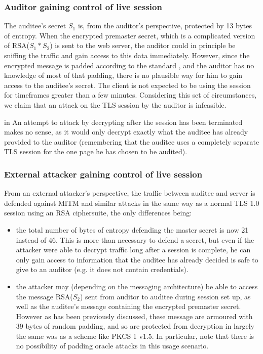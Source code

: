 \documentclass[10pt,a4paper]{article}
\begin{document}
\subsubsection{Auditor gaining control of live session}

\noindent The auditee's secret $S_1$ is, from the auditor's perspective, protected by 13 bytes of entropy. When the encrypted premaster secret, which is a complicated version of RSA($S_1*S_2$) is sent to the web server, the auditor could in principle be sniffing the traffic and gain access to this data immediately. However, since the encrypted message is padded according to the standard \cite{RSA_spec}, and the auditor has no knowledge of most of that padding, there is no plausible way for him to gain access to the auditee's secret. The client is not expected to be using the session for timeframes greater than a few minutes. Considering this set of circumstances, we claim that an attack on the TLS session by the auditor is infeasible.

 in
\noindent An attempt to attack by decrypting after the session has been terminated makes no sense, as it would only decrypt exactly what the auditee has already provided to the auditor (remembering that the auditee uses a completely separate TLS session for the one page he has chosen to be audited).

\subsubsection{External attacker gaining control of live session}

\noindent From an external attacker's perspective, the traffic between auditee and server is defended against MITM and similar attacks in the same way as a normal TLS 1.0 session using an RSA ciphersuite, the only differences being: 
\begin{itemize}
\item the total number of bytes of entropy defending the master secret is now 21 instead of 46. This is more than necessary to defend a secret, but even if the attacker were able to decrypt traffic long after a session is complete, he can only gain access to information that the auditee has already decided is safe to give to an auditor (e.g. it does not contain credentials).
\item the attacker may (depending on the messaging architecture) be able to access the message RSA($S_2$) sent from auditor to auditee during session set up, as well as the auditee's message containing the encrypted premaster secret. However as has been previously discussed, these message are armoured with 39 bytes of random padding, and so are protected from decryption in largely the same was as a scheme like PKCS 1 v1.5. In particular, note that there is no possibility of padding oracle attacks in this usage scenario. 
\end{itemize}
\end{document}
